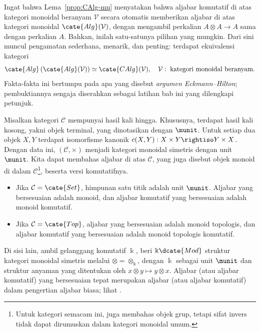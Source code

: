 Ingat bahwa Lema~\ref{prop:CAlg-mu} menyatakan bahwa aljabar komutatif di atas
kategori monoidal beranyam $\mathcal{V}$ secara otomatis memberikan aljabar di
atas kategori monoidal $\cate{Alg}(\mathcal{V})$, dengan mengambil perkalian
$A\otimes A\to A$ sama dengan perkalian $A$. Bahkan, inilah satu-satunya
pilihan yang mungkin. Dari sini muncul pengamatan sederhana, menarik, dan
penting: terdapat ekuivalensi kategori
\begin{equation}\label{eqn:AlgAlg-CAlg}
	\cate{Alg}\left(\cate{Alg}(\mathcal{V}) \right) \simeq \cate{CAlg}(\mathcal{V}), \quad \mathcal{V}:\;\text{kategori monoidal beranyam}.
\end{equation}
Fakta-fakta ini bertumpu pada apa yang disebut \emph{argumen
Eckmann--Hilton}; pembuktiannya sengaja diserahkan sebagai latihan bab ini
yang dilengkapi petunjuk.

\begin{contoh}\label{eg:Cartesius-monoidal}
	Misalkan kategori $\mathcal{C}$ mempunyai hasil kali hingga. Khususnya,
	terdapat hasil kali kosong, yakni objek terminal, yang dinotasikan dengan
	$\munit$. Untuk setiap dua objek $X,Y$ terdapat isomorfisme kanonik
	$c(X,Y):X\times Y\rightiso Y\times X$. Dengan data ini,
	$(\mathcal{C},\times)$ menjadi kategori monoidal simetris dengan unit
	$\munit$. Kita dapat membahas aljabar di atas $\mathcal{C}$, yang juga
	disebut objek monoid di dalam $\mathcal{C}$\footnote{Untuk kategori semacam
	ini, \cite[\S 4.11]{Li1} juga membahas objek grup, tetapi sifat invers tidak
	dapat dirumuskan dalam kategori monoidal umum.}, beserta versi komutatifnya.
	\begin{itemize}
		\item Jika $\mathcal{C}=\cate{Set}$, himpunan satu titik adalah unit $\munit$. Aljabar yang bersesuaian adalah monoid, dan aljabar komutatif yang bersesuaian adalah monoid komutatif.
		\item Jika $\mathcal{C}=\cate{Top}$, aljabar yang bersesuaian adalah monoid topologis, dan aljabar komutatif yang bersesuaian adalah monoid topologis komutatif.
	\end{itemize}
	
	Di sisi lain, ambil gelanggang komutatif $\Bbbk$, beri
	$\Bbbk\dcate{Mod}$ struktur kategori monoidal simetris melalui
	$\otimes=\otimes_{\Bbbk}$, dengan $\Bbbk$ sebagai unit $\munit$ dan
	struktur anyaman yang ditentukan oleh $x\otimes y\mapsto y\otimes x$.
	Aljabar (atau aljabar komutatif) yang bersesuaian tepat merupakan aljabar
	(atau aljabar komutatif) dalam pengertian aljabar biasa; lihat
	\cite[Definisi 7.1.1]{Li1}.
\end{contoh}

